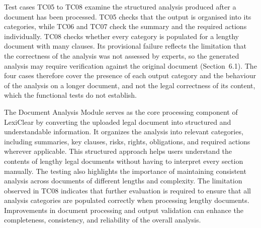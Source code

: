 \documentclass[12pt,a4paper,oneside]{report}
\begin{document}
Test cases TC05 to TC08 examine the structured analysis produced after a document has been processed. TC05 checks that the output is organised into its categories, while TC06 and TC07 check the summary and the required actions individually. TC08 checks whether every category is populated for a lengthy document with many clauses. Its provisional failure reflects the limitation that the correctness of the analysis was not assessed by experts, so the generated analysis may require verification against the original document (Section~6.1). The four cases therefore cover the presence of each output category and the behaviour of the analysis on a longer document, and not the legal correctness of its content, which the functional tests do not establish.

The Document Analysis Module serves as the core processing component of LexiClear by converting the uploaded legal document into structured and understandable information. It organizes the analysis into relevant categories, including summaries, key clauses, risks, rights, obligations, and required actions wherever applicable. This structured approach helps users understand the contents of lengthy legal documents without having to interpret every section manually. The testing also highlights the importance of maintaining consistent analysis across documents of different lengths and complexity. The limitation observed in TC08 indicates that further evaluation is required to ensure that all analysis categories are populated correctly when processing lengthy documents. Improvements in document processing and output validation can enhance the completeness, consistency, and reliability of the overall analysis.

\end{document}
